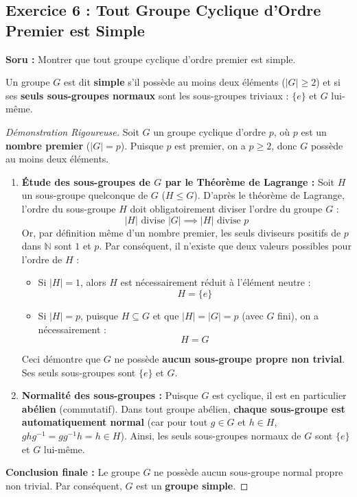 \documentclass[12pt,a4paper]{report}
\begin{document}
\subsection*{Exercice 6 : Tout Groupe Cyclique d'Ordre Premier est Simple}
\textbf{Soru :} Montrer que tout groupe cyclique d'ordre premier est simple.

\begin{tcolorbox}[colback=red!5!white,colframe=red!75!black,title=Tanım : Basit Grup (Groupe Simple)]
Un groupe $G$ est dit \textbf{simple} s'il possède au moins deux éléments ($|G| \geq 2$) et si ses \textbf{seuls sous-groupes normaux} sont les sous-groupes triviaux : $\{e\}$ et $G$ lui-même.
\end{tcolorbox}

\begin{proof}[Démonstration Rigoureuse]
Soit $G$ un groupe cyclique d'ordre $p$, où $p$ est un \textbf{nombre premier} ($|G| = p$).  
Puisque $p$ est premier, on a $p \geq 2$, donc $G$ possède au moins deux éléments.

\begin{enumerate}
    \item \textbf{Étude des sous-groupes de $G$ par le Théorème de Lagrange :}  
    Soit $H$ un sous-groupe quelconque de $G$ ($H \leq G$).  
    D'après le théorème de Lagrange, l'ordre du sous-groupe $H$ doit obligatoirement diviser l'ordre du groupe $G$ :
    \[ |H| \text{ divise } |G| \implies |H| \text{ divise } p \]
    Or, par définition même d'un nombre premier, les seuls diviseurs positifs de $p$ dans $\mathbb{N}$ sont $1$ et $p$.  
    Par conséquent, il n'existe que deux valeurs possibles pour l'ordre de $H$ :
    \begin{itemize}
        \item Si $|H| = 1$, alors $H$ est nécessairement réduit à l'élément neutre :
        \[ H = \{e\} \]
        \item Si $|H| = p$, puisque $H \subseteq G$ et que $|H| = |G| = p$ (avec $G$ fini), on a nécessairement :
        \[ H = G \]
    \end{itemize}
    Ceci démontre que $G$ ne possède \textbf{aucun sous-groupe propre non trivial}. Ses seuls sous-groupes sont $\{e\}$ et $G$.

    \item \textbf{Normalité des sous-groupes :}  
    Puisque $G$ est cyclique, il est en particulier \textbf{abélien} (commutatif).  
    Dans tout groupe abélien, \textbf{chaque sous-groupe est automatiquement normal} (car pour tout $g \in G$ et $h \in H$, $ghg^{-1} = gg^{-1}h = h \in H$).  
    Ainsi, les seuls sous-groupes normaux de $G$ sont $\{e\}$ et $G$ lui-même.
\end{enumerate}
\textbf{Conclusion finale :} Le groupe $G$ ne possède aucun sous-groupe normal propre non trivial. Par conséquent, $G$ est un \textbf{groupe simple}.
\end{proof}
\end{document}
